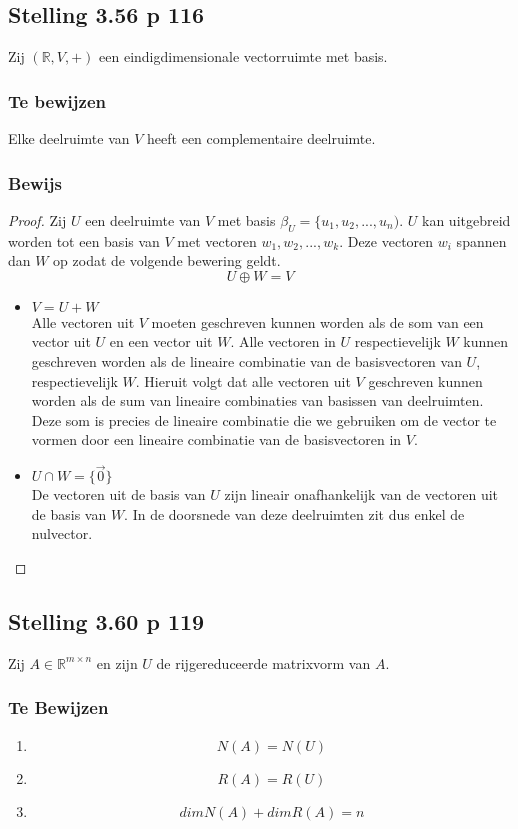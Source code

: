 \documentclass[lineaire_algebra_oplossingen.tex]{subfiles}
\begin{document}
\subsection{Stelling 3.56 p 116}
Zij $(\mathbb{R},V,+)$ een eindigdimensionale vectorruimte met basis.
\subsubsection*{Te bewijzen}
Elke deelruimte van $V$ heeft een complementaire deelruimte.
\subsubsection*{Bewijs}
\begin{proof}
Zij $U$ een deelruimte van $V$ met basis $\beta_U = \{u_1,u_2,...,u_n)$. $U$ kan uitgebreid worden tot een basis van $V$ met vectoren $w_1,w_2,...,w_k$. Deze vectoren $w_i$ spannen dan $W$ op zodat de volgende bewering geldt.
\[
U \oplus W = V
\]
\begin{itemize}
\item $V = U + W$\\
Alle vectoren uit $V$ moeten geschreven kunnen worden als de som van een vector uit $U$ en een vector uit $W$. Alle vectoren in $U$ respectievelijk $W$ kunnen geschreven worden als de lineaire combinatie van de basisvectoren van $U$, respectievelijk $W$. Hieruit volgt dat alle vectoren uit $V$ geschreven kunnen worden als de sum van lineaire combinaties van basissen van deelruimten. Deze som is precies de lineaire combinatie die we gebruiken om de vector te vormen door een lineaire combinatie van de basisvectoren in $V$.

\item $U\cap W = \{\vec{0}\}$\\
De vectoren uit de basis van $U$ zijn lineair onafhankelijk van de vectoren uit de basis van $W$. In de doorsnede van deze deelruimten zit dus enkel de nulvector.
\end{itemize}
\end{proof}

\subsection{Stelling 3.60 p 119}
Zij $A \in \mathbb{R}^{m\times n}$ en zijn $U$ de rijgereduceerde matrixvorm van $A$.
\subsubsection*{Te Bewijzen}
\begin{enumerate}
\item 
\[
N(A) = N(U)
\]
\item
\[
R(A) = R(U)
\]
\item
\[
dimN(A) + dimR(A) = n
\]
\end{enumerate}
\end{document}
